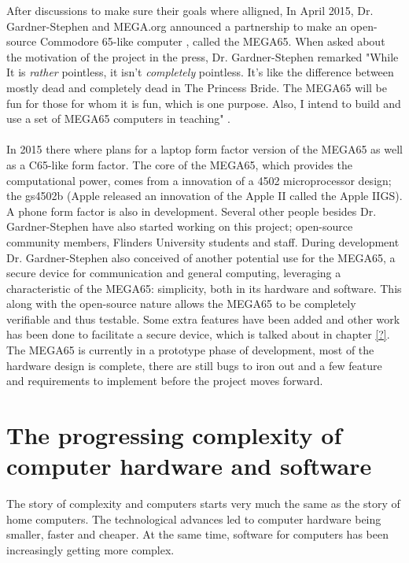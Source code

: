 After discussions to make sure their goals where alligned, In April 2015, Dr. Gardner-Stephen and MEGA.org announced a partnership to make an open-source Commodore 65-like computer \cite{megaintro}, called the MEGA65. When asked about the motivation of the project in the press, Dr. Gardner-Stephen remarked "While It is \textit{rather} pointless, it isn't \textit{completely} pointless. It's like the difference between mostly dead and completely dead in The Princess Bride.  The MEGA65 will be fun for those for whom it is fun, which is one purpose.  Also, I intend to build and use a set of MEGA65 computers in teaching" \cite{blogapril15}.  \\\\
In 2015 there where plans for a laptop form factor version of the MEGA65 as well as a C65-like form factor. The core of  the MEGA65, which provides the computational power, comes from a innovation of a 4502 microprocessor design; the gs4502b (Apple released an innovation of the Apple II called the Apple IIGS). A phone form factor is also in development. Several other people besides Dr. Gardner-Stephen have also started working on this project; open-source community members, Flinders University students and staff. During development Dr. Gardner-Stephen also conceived of another potential use for the MEGA65, a secure device for communication and general computing, leveraging a characteristic of the MEGA65: simplicity, both in its hardware and software. This along with the open-source nature allows the MEGA65 to be completely verifiable and thus testable. Some extra features have been added and other work has been done to facilitate a secure device, which is talked about in chapter \ref{?}. The MEGA65 is currently in a prototype phase of development, most of the hardware design is complete, there are still bugs to iron out and a few feature and requirements to implement before the project moves forward.

\section{The progressing complexity of computer hardware and software}
The story of complexity and computers starts very much the same as the story of home computers. The technological advances led to computer hardware being smaller, faster and cheaper. At the same time, software for computers has been increasingly getting more complex. 

